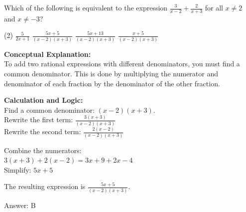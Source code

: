 \documentclass[11pt,paper=a4,answers]{exam}
\begin{document}
\begin{questions}
\pointsinrightmargin
\pointsdroppedatright
\marksnotpoints
{}
\pointformat{\boldmath\themarginpoints}
\bracketedpoints



\question
Which of the following is equivalent to the expression $\frac{3}{x-2} + \frac{2}{x+3}$ for all $x \neq 2$ and $x \neq -3$?
\begin{tasks}(2)
    \task $\frac{5}{2x+1}$
    \task $\frac{5x+5}{(x-2)(x+3)}$
    \task $\frac{5x+13}{(x-2)(x+3)}$
    \task $\frac{x+5}{(x-2)(x+3)}$
\end{tasks}

\begin{solution}
\textbf{Conceptual Explanation:} \\
To add two rational expressions with different denominators, you must find a common denominator. This is done by multiplying the numerator and denominator of each fraction by the denominator of the other fraction.

\vspace{20pt}

\textbf{Calculation and Logic:} \\
Find a common denominator: $(x-2)(x+3)$. \\
Rewrite the first term: $\frac{3(x+3)}{(x-2)(x+3)}$ \\
Rewrite the second term: $\frac{2(x-2)}{(x-2)(x+3)}$

\vspace{10pt}

Combine the numerators: \\
$3(x+3) + 2(x-2) = 3x + 9 + 2x - 4$ \\
Simplify: $5x + 5$

\vspace{10pt}

The resulting expression is $\frac{5x+5}{(x-2)(x+3)}$.

\vspace{25pt}

Answer: \colorbox{yellow!100}{B}
\end{solution}


\end{questions}
\end{document}
